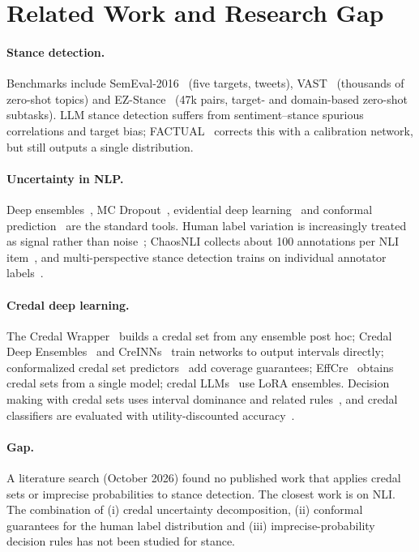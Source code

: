 \documentclass[11pt,a4paper]{article}
\begin{document}
\section{Related Work and Research Gap}

\paragraph{Stance detection.} Benchmarks include SemEval-2016~\cite{mohammad2016} (five
targets, tweets), VAST~\cite{allaway2020} (thousands of zero-shot topics) and
EZ-Stance~\cite{zhao2024} (47k pairs, target- and domain-based zero-shot subtasks). LLM
stance detection suffers from sentiment--stance spurious correlations and target bias;
FACTUAL~\cite{factual2024} corrects this with a calibration network, but still outputs a
single distribution.

\paragraph{Uncertainty in NLP.} Deep ensembles~\cite{lakshminarayanan2017}, MC
Dropout~\cite{gal2016}, evidential deep learning~\cite{sensoy2018} and conformal
prediction~\cite{angelopoulos2023} are the standard tools. Human label variation is
increasingly treated as signal rather than noise~\cite{plank2022,uma2021}; ChaosNLI collects
about 100 annotations per NLI item~\cite{nie2020}, and multi-perspective stance detection
trains on individual annotator labels~\cite{muscato2024}.

\paragraph{Credal deep learning.} The Credal Wrapper~\cite{wang2025wrapper} builds a credal
set from any ensemble post hoc; Credal Deep Ensembles~\cite{wang2024crede} and
CreINNs~\cite{wang2025creinn} train networks to output intervals directly; conformalized
credal set predictors~\cite{javanmardi2024} add coverage guarantees; EffCre~\cite{hofman2026}
obtains credal sets from a single model; credal LLMs~\cite{manchingal2026} use LoRA
ensembles. Decision making with credal sets uses interval dominance and related
rules~\cite{troffaes2007}, and credal classifiers are evaluated with utility-discounted
accuracy~\cite{zaffalon2012}.

\paragraph{Gap.} A literature search (October 2026) found no published work that applies
credal sets or imprecise probabilities to stance detection. The closest work is on NLI. The
combination of (i) credal uncertainty decomposition, (ii) conformal guarantees for the human
label distribution and (iii) imprecise-probability decision rules has not been studied for
stance.
\end{document}
